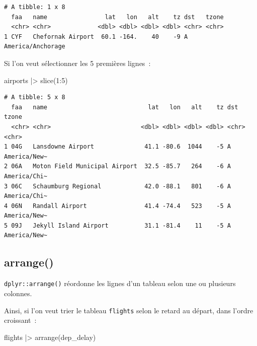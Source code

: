 \documentclass[
  letterpaper,
  DIV=11,
  numbers=noendperiod,
  oneside]{scrreprt}
\newenvironment{Shaded}{\begin{snugshade}}{\end{snugshade}}
\newcommand{\DecValTok}[1]{\textcolor[rgb]{0.68,0.00,0.00}{#1}}
\newcommand{\FunctionTok}[1]{\textcolor[rgb]{0.28,0.35,0.67}{#1}}
\newcommand{\NormalTok}[1]{\textcolor[rgb]{0.00,0.23,0.31}{#1}}
\newcommand{\SpecialCharTok}[1]{\textcolor[rgb]{0.37,0.37,0.37}{#1}}
\begin{document}
\begin{verbatim}
# A tibble: 1 x 8
  faa   name                lat   lon   alt    tz dst   tzone            
  <chr> <chr>             <dbl> <dbl> <dbl> <dbl> <chr> <chr>            
1 CYF   Chefornak Airport  60.1 -164.    40    -9 A     America/Anchorage
\end{verbatim}

Si l'on veut sélectionner les 5 premières lignes~:

\begin{Shaded}
\begin{Highlighting}[]
\NormalTok{airports }\SpecialCharTok{|\textgreater{}} 
  \FunctionTok{slice}\NormalTok{(}\DecValTok{1}\SpecialCharTok{:}\DecValTok{5}\NormalTok{)}
\end{Highlighting}
\end{Shaded}

\begin{verbatim}
# A tibble: 5 x 8
  faa   name                            lat   lon   alt    tz dst   tzone       
  <chr> <chr>                         <dbl> <dbl> <dbl> <dbl> <chr> <chr>       
1 04G   Lansdowne Airport              41.1 -80.6  1044    -5 A     America/New~
2 06A   Moton Field Municipal Airport  32.5 -85.7   264    -6 A     America/Chi~
3 06C   Schaumburg Regional            42.0 -88.1   801    -6 A     America/Chi~
4 06N   Randall Airport                41.4 -74.4   523    -5 A     America/New~
5 09J   Jekyll Island Airport          31.1 -81.4    11    -5 A     America/New~
\end{verbatim}

\hypertarget{arrange}{%
\subsection{arrange()}\label{arrange}}

\texttt{dplyr::arrange()} réordonne les lignes d'un tableau selon une ou
plusieurs colonnes.

Ainsi, si l'on veut trier le tableau \texttt{flights} selon le retard au
départ, dans l'ordre croissant~:

\begin{Shaded}
\begin{Highlighting}[]
\NormalTok{flights }\SpecialCharTok{|\textgreater{}} 
  \FunctionTok{arrange}\NormalTok{(dep\_delay)}
\end{Highlighting}
\end{Shaded}
\end{document}
